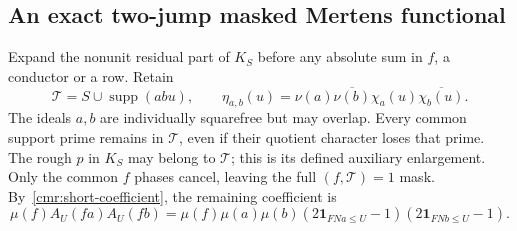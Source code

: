 \subsection{An exact two-jump masked Mertens functional}\label{cmr:abel}
Expand the nonunit residual part of $K_S$ before any absolute sum in
$f$, a conductor or a row. Retain
\[
 \mathcal T=S\cup\operatorname{supp}(abu),\qquad
 \eta_{a,b}(u)=\nu(a)\overline{\nu(b)}
                    \chi_a(u)\overline{\chi_b(u)}.
\]
The ideals $a,b$ are individually squarefree but may overlap.
Every common support prime remains in $\mathcal T$, even if their
quotient character loses that prime. The rough $p$ in $K_S$ may
belong to $\mathcal T$; this is its defined auxiliary enlargement.
Only the common $f$ phases cancel, leaving the full $(f,\mathcal T)=1$
mask. By~\eqref{cmr:short-coefficient}, the remaining coefficient is
\[
 \mu(f)A_U(fa)A_U(fb)
  =\mu(f)\mu(a)\mu(b)
     (2\mathbf1_{FNa\le U}-1)(2\mathbf1_{FNb\le U}-1).
\]

